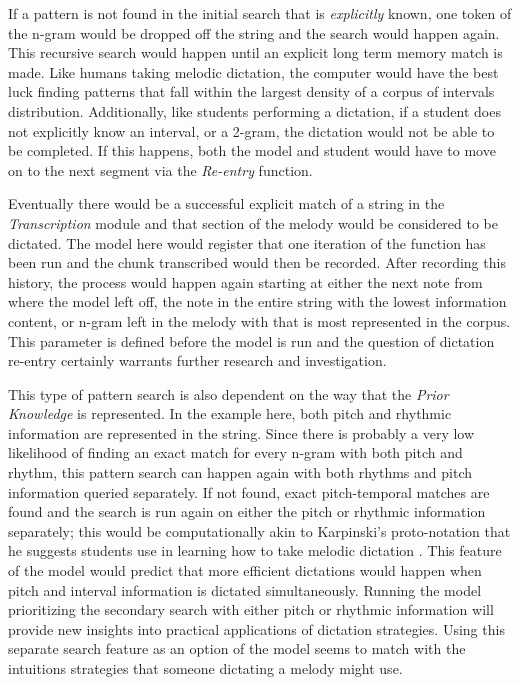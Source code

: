 \documentclass[]{book}
\begin{document}
If a pattern is not found in the initial search that is \emph{explicitly} known, one token of the n-gram would be dropped off the string and the search would happen again.
This recursive search would happen until an explicit long term memory match is made.
Like humans taking melodic dictation, the computer would have the best luck finding patterns that fall within the largest density of a corpus of intervals distribution.
Additionally, like students performing a dictation, if a student does not explicitly know an interval, or a 2-gram, the dictation would not be able to be completed.
If this happens, both the model and student would have to move on to the next segment via the \emph{Re-entry} function.

Eventually there would be a successful explicit match of a string in the \emph{Transcription} module and that section of the melody would be considered to be dictated.
The model here would register that one iteration of the function has been run and the chunk transcribed would then be recorded.
After recording this history, the process would happen again starting at either the next note from where the model left off, the note in the entire string with the lowest information content, or n-gram left in the melody with that is most represented in the corpus.
This parameter is defined before the model is run and the question of dictation re-entry certainly warrants further research and investigation.

This type of pattern search is also dependent on the way that the \emph{Prior Knowledge} is represented.
In the example here, both pitch and rhythmic information are represented in the string.
Since there is probably a very low likelihood of finding an exact match for every n-gram with both pitch and rhythm, this pattern search can happen again with both rhythms and pitch information queried separately.
If not found, exact pitch-temporal matches are found and the search is run again on either the pitch or rhythmic information separately; this would be computationally akin to Karpinski's proto-notation that he suggests students use in learning how to take melodic dictation \citep[p.88]{karpinskiAuralSkillsAcquisition2000}.
This feature of the model would predict that more efficient dictations would happen when pitch and interval information is dictated simultaneously.
Running the model prioritizing the secondary search with either pitch or rhythmic information will provide new insights into practical applications of dictation strategies.
Using this separate search feature as an option of the model seems to match with the intuitions strategies that someone dictating a melody might use.
\end{document}
